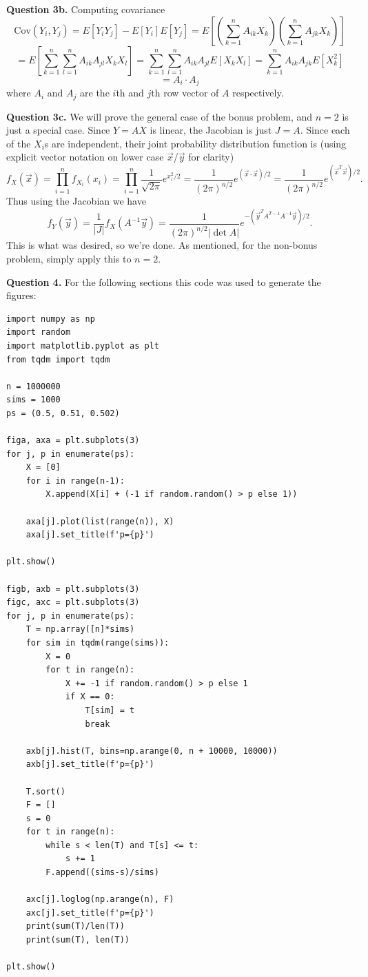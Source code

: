 \documentclass[letterpaper, reqno,11pt]{article}
\begin{document}
{\medskip\noindent\bf Question 3b.} Computing covariance
\[
    \text{Cov}(Y_i,Y_j)=E[Y_iY_j]-E[Y_i]E[Y_j]=E\left[\left(\sum_{k=1}^{n}A_{ik}X_k\right)\left( \sum_{k=1}^{n}A_{jk}X_k \right) \right]
\]
\[
    =E\left[\sum_{k=1}^{n}\sum_{l=1}^{n}A_{ik}A_{jl}X_kX_l\right]=\sum_{k=1}^{n}\sum_{l=1}^{n}A_{ik}A_{jl}E[X_kX_l]=\sum_{k=1}^{n}A_{ik}A_{jk}E[X_k^2]
\]
\[
=A_i\cdot A_j
\]
where $A_i$ and $A_j$ are the $i$th and $j$th row vector of $A$ respectively.

{\medskip\noindent\bf Question 3c.} We will prove the general case of the bonus problem, and $n=2$ is just a special case. Since $Y=AX$ is linear, the Jacobian is just $J=A$. Since each of the $X_i$s are independent, their joint probability distribution function is (using explicit vector notation on lower case $\vec x$/$\vec y$ for clarity)
\[
    f_X(\vec x)=\prod_{i=1}^{n}f_{X_i}(x_i)=\prod_{i=1}^{n}\frac{1}{\sqrt{2\pi} }e^{x_i^2 /2}=\frac{1}{(2\pi)^{n/2}}e^{(\vec x\cdot\vec x)/2}=\frac{1}{(2\pi)^{n/2}}e^{(\vec x^{T}\vec x)/2}
.\]
Thus using the Jacobian we have
\[
f_Y(\vec y)=\frac{1}{|J|}f_X\left( A^{-1}\vec y \right)=\frac{1}{(2\pi)^{n /2}|\det A|}e^{-\left( \vec y^{T}A^{T-1}A^{-1}\vec y \right) /2}
.\]
This is what was desired, so we're done. As mentioned, for the non-bonus problem, simply apply this to $n=2$. 

{\medskip\noindent\bf Question 4.} For the following sections this code was used to generate the figures:

\begin{lstlisting}
import numpy as np
import random
import matplotlib.pyplot as plt
from tqdm import tqdm

n = 1000000
sims = 1000
ps = (0.5, 0.51, 0.502)

figa, axa = plt.subplots(3)
for j, p in enumerate(ps):
    X = [0]
    for i in range(n-1):
        X.append(X[i] + (-1 if random.random() > p else 1))
        
    axa[j].plot(list(range(n)), X)
    axa[j].set_title(f'p={p}')

plt.show()

figb, axb = plt.subplots(3)
figc, axc = plt.subplots(3)
for j, p in enumerate(ps):
    T = np.array([n]*sims)
    for sim in tqdm(range(sims)):
        X = 0
        for t in range(n):
            X += -1 if random.random() > p else 1
            if X == 0:
                T[sim] = t
                break

    axb[j].hist(T, bins=np.arange(0, n + 10000, 10000))
    axb[j].set_title(f'p={p}')

    T.sort()
    F = []
    s = 0
    for t in range(n):
        while s < len(T) and T[s] <= t:
            s += 1
        F.append((sims-s)/sims)

    axc[j].loglog(np.arange(n), F)
    axc[j].set_title(f'p={p}')
    print(sum(T)/len(T))
    print(sum(T), len(T))

plt.show()
\end{lstlisting}
\end{document}
